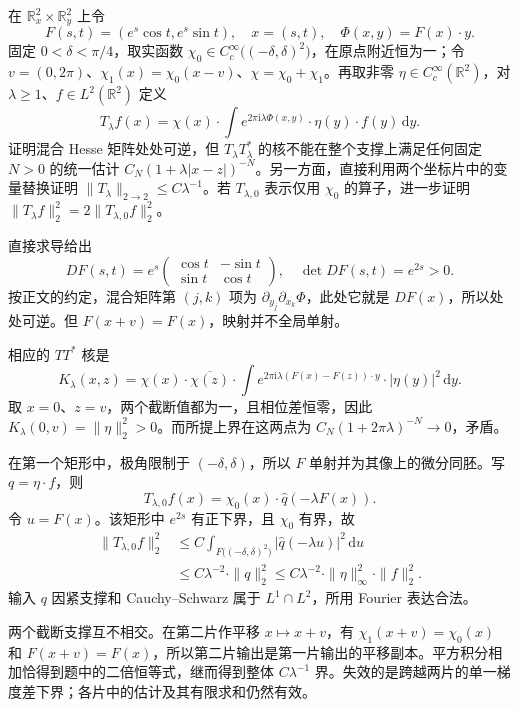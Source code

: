 \begin{exercise}\label{b2:ex:21-new-5}
在 \(\mathbb R_x^2\times\mathbb R_y^2\) 上令
\[
 F(s,t)=(e^s\cos t,e^s\sin t),
 \quad x=(s,t),\quad \Phi(x,y)=F(x)\cdot y.
\]
固定 \(0<\delta<\pi/4\)，取实函数 \(\chi_0\in C_c^\infty\bigl((-\delta,\delta)^2\bigr)\)，在原点附近恒为一；令 \(v=(0,2\pi)\)、\(\chi_1(x)=\chi_0(x-v)\)、\(\chi=\chi_0+\chi_1\)。再取非零 \(\eta\in C_c^\infty(\mathbb R^2)\)，对 \(\lambda\geq1\)、\(f\in L^2(\mathbb R^2)\) 定义
\[
 T_\lambda f(x)=\chi(x)\cdot
       \int e^{2\pi\mathrm i\lambda\Phi(x,y)}\cdot\eta(y)\cdot f(y)\,\mathrm dy.
\]
证明混合 Hesse 矩阵处处可逆，但 \(T_\lambda T_\lambda^*\) 的核不能在整个支撑上满足任何固定 \(N>0\) 的统一估计
\(C_N(1+\lambda|x-z|)^{-N}\)。另一方面，直接利用两个坐标片中的变量替换证明
\(\|T_\lambda\|_{2\to2}\leq C\lambda^{-1}\)。若 \(T_{\lambda,0}\) 表示仅用 \(\chi_0\) 的算子，进一步证明
\(\|T_\lambda f\|_2^2=2\|T_{\lambda,0}f\|_2^2\)。
\end{exercise}
\begin{solution}
直接求导给出
\[
 DF(s,t)=e^s
 \begin{pmatrix}\cos t&-\sin t\\\sin t&\cos t\end{pmatrix},
 \quad\det DF(s,t)=e^{2s}>0.
\]
按正文的约定，混合矩阵第 \((j,k)\) 项为 \(\partial_{y_j}\partial_{x_k}\Phi\)，此处它就是 \(DF(x)\)，所以处处可逆。但 \(F(x+v)=F(x)\)，映射并不全局单射。

相应的 \(TT^*\) 核是
\[
 K_\lambda(x,z)=\chi(x)\cdot\overline{\chi(z)}\cdot
       \int e^{2\pi\mathrm i\lambda(F(x)-F(z))\cdot y}
                                      \cdot|\eta(y)|^2\,\mathrm dy.
\]
取 \(x=0\)、\(z=v\)，两个截断值都为一，且相位差恒零，因此
\(K_\lambda(0,v)=\|\eta\|_2^2>0\)。而所提上界在这两点为 \(C_N(1+2\pi\lambda)^{-N}\to0\)，矛盾。

在第一个矩形中，极角限制于 \((-\delta,\delta)\)，所以 \(F\) 单射并为其像上的微分同胚。写 \(q=\eta\cdot f\)，则
\[
 T_{\lambda,0}f(x)=\chi_0(x)\cdot\widehat q(-\lambda F(x)).
\]
令 \(u=F(x)\)。该矩形中 \(e^{2s}\) 有正下界，且 \(\chi_0\) 有界，故
\[
 \begin{aligned}
 \|T_{\lambda,0}f\|_2^2
 &\leq C\int_{F\bigl((-\delta,\delta)^2\bigr)}
                      |\widehat q(-\lambda u)|^2\,\mathrm du\\
 &\leq C\lambda^{-2}\cdot\|q\|_2^2
 \leq C\lambda^{-2}\cdot\|\eta\|_\infty^2\cdot\|f\|_2^2.
 \end{aligned}
\]
输入 \(q\) 因紧支撑和 Cauchy--Schwarz 属于 \(L^1\cap L^2\)，所用 Fourier 表达合法。

两个截断支撑互不相交。在第二片作平移 \(x\mapsto x+v\)，有
\(\chi_1(x+v)=\chi_0(x)\) 和 \(F(x+v)=F(x)\)，所以第二片输出是第一片输出的平移副本。平方积分相加恰得到题中的二倍恒等式，继而得到整体 \(C\lambda^{-1}\) 界。失效的是跨越两片的单一梯度差下界；各片中的估计及其有限求和仍然有效。
\end{solution}

